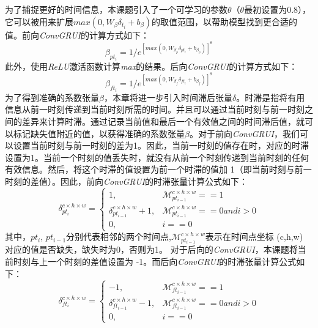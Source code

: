 为了捕捉更好的时间信息，本课题引入了一个可学习的参数${\theta}$（${\theta}$最初设置为0.8），它可以被用来扩展$max(0,W_{{\beta}}{\delta}_{t_i}+b_{{\beta}})$的取值范围，以帮助模型找到更合适的值。前向\textit{ConvGRUI}的计算方式如下：
\begin{equation}
{\beta}_{pt_i}=1/e^{[max(0,W_{{\beta}_p}{\delta}_{pt_i}+b_{{\beta}_p})]^{\theta}}
\end{equation}                                              
此外，使用\textit{ReLU}激活函数计算\textit{max}的结果。后向\textit{ConvGRUI}的计算方式如下：
\begin{equation}
{\beta}_{ft_i}=1/e^{[max(0,W_{{\beta}_f}{\delta}_{ft_i}+b_{{\beta}_f})]^{\theta}}
\end{equation}
为了得到准确的系数张量$\beta$，本章将进一步引入时间滞后张量$\delta$。时滞是指将有用信息从前一时刻传递到当前时刻所需的时间。并且可以通过当前时刻与前一时刻之间的差异来计算时滞。通过记录当前值和最后一个有效值之间的时间滞后值，就可以标记缺失值附近的值，以获得准确的系数张量$\beta$。对于前向\textit{ConvGRUI}，我们可以设置当前时刻与前一时刻的差为1。因此，当前一时刻的值存在时，对应的时滞设置为1。当前一个时刻的值丢失时，就没有从前一个时刻传递到当前时刻的任何有效信息。然后，将这个时滞的值设置为前一个时滞的值加 1（即当前时刻与前一时刻的差值）。因此，前向\textit{ConvGRUI}的时滞张量计算公式如下： 
\begin{equation}
{\delta}_{pt_i}^{c\times h\times w}=\begin{cases}
1,&\mathcal{M}_{pt_{i-1}}^{c\times h\times w}==1\\
{\delta}_{pt_{i-1}}^{c\times h\times w}+1,&\mathcal{M}_{pt_{i-1}}^{c\times h\times w}==0 and i>0\\
0,&i==0
\end{cases}
\end{equation}
其中，$pt_i$, $pt_{i-1}$分别代表相邻的两个时间点,$\mathcal{M}_{pt_{i-1}}^{c\times h\times w}$表示在时间点坐标 (c,h,w) 对应的值是否缺失，缺失时为0，否则为1。
对于后向的\textit{ConvGRUI}，本课题将当前时刻与上一个时刻的差值设置为 -1。而后向\textit{ConvGRUI}的时滞张量计算公式如下：
\begin{equation}
{\delta}_{ft_i}^{c\times h\times w}=\begin{cases}
-1,&\mathcal{M}_{ft_{i-1}}^{c\times h\times w}==1\\
{\delta}_{ft_{i-1}}^{c\times h\times w}-1,&\mathcal{M}_{ft_{i-1}}^{c\times h\times w}==0 and i>0\\
0,&i==0
\end{cases}
\end{equation}
